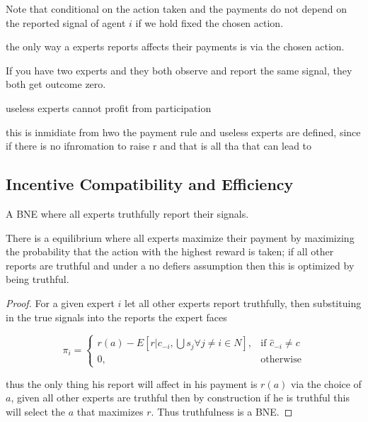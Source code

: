 Note that conditional on the action taken and the payments do not depend on the reported signal of agent $i$ if we hold fixed the chosen action. 

\begin{lem}
	the only way a experts reports affects their payments is via the chosen action.
\end{lem}

\begin{eg}
	If you have two experts and they both observe and report the same signal, they both get outcome zero. 
\end{eg}


\begin{lem}
	useless experts cannot profit from participation
\end{lem}

this is inmidiate from hwo the payment rule and useless experts are defined, since if there is no ifnromation to raise r and that is all tha that can lead to 

\subsection{Incentive Compatibility and Efficiency}


\begin{defn}
	A BNE where all experts truthfully report their signals.
\end{defn}

There is a  equilibrium where all experts maximize their payment by maximizing the probability that the action with the highest reward is taken; if all other reports are truthful and under a no defiers assumption then this is optimized by being truthful.

\begin{proof}
For a given expert $i$ let all other experts report truthfully, then substituing in the true signals into the reports the expert faces 


\[
    \pi_i = 
\begin{cases}
    r(a) -  E[ r| c_{-i}, \bigcup s_j  \forall j \neq i \in N] ,& \text{if } \hat{c}_{-i} \neq c\\
    0,              & \text{otherwise}
\end{cases}
\]

thus the only thing his report will affect in his payment is $r(a)$ via the choice of $a$, given all other experts are truthful then by construction if he is truthful this will select the $a$ that maximizes $r$. Thus truthfulness is a BNE.

\end{proof}

